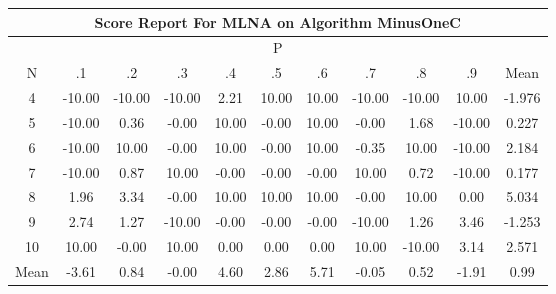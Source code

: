 \documentclass[11pt,a4paper]{report}
\begin{document}
\begin{longtable}{ | c || c | c | c | c | c | c | c | c | c || c |}
\hline
\multicolumn{11}{|c|}{ Score Report For MLNA on Algorithm MinusOneC} \\
\hline
\multicolumn{11}{|c|}{ P } \\
\hline
N & .1 & .2 & .3 & .4 & .5 & .6 & .7 & .8 & .9 & Mean\\
 \hline
 \hline
 \endhead
  4 &  \cellcolor[HTML]{FF0000} -10.00 &  \cellcolor[HTML]{FF0000} -10.00 &  \cellcolor[HTML]{FF0000} -10.00 &  \cellcolor[HTML]{C7C7FF} 2.21 &  \cellcolor[HTML]{0808FF} 10.00 &  \cellcolor[HTML]{0808FF} 10.00 &  \cellcolor[HTML]{FF0000} -10.00 &  \cellcolor[HTML]{FF0000} -10.00 &  \cellcolor[HTML]{0808FF} 10.00 & -1.976 \\
  5 &  \cellcolor[HTML]{FF0000} -10.00 &  \cellcolor[HTML]{F7F7FF} 0.36 &  \cellcolor[HTML]{FFFFFF} -0.00 &  \cellcolor[HTML]{0808FF} 10.00 &  \cellcolor[HTML]{FFFFFF} -0.00 &  \cellcolor[HTML]{0808FF} 10.00 &  \cellcolor[HTML]{FFFFFF} -0.00 &  \cellcolor[HTML]{D7D7FF} 1.68 &  \cellcolor[HTML]{FF0000} -10.00 & 0.227 \\
  6 &  \cellcolor[HTML]{FF0000} -10.00 &  \cellcolor[HTML]{0808FF} 10.00 &  \cellcolor[HTML]{FFFFFF} -0.00 &  \cellcolor[HTML]{0808FF} 10.00 &  \cellcolor[HTML]{FFFFFF} -0.00 &  \cellcolor[HTML]{0808FF} 10.00 &  \cellcolor[HTML]{FFF7F7} -0.35 &  \cellcolor[HTML]{0808FF} 10.00 &  \cellcolor[HTML]{FF0000} -10.00 & 2.184 \\
  7 &  \cellcolor[HTML]{FF0000} -10.00 &  \cellcolor[HTML]{E7E7FF} 0.87 &  \cellcolor[HTML]{0808FF} 10.00 &  \cellcolor[HTML]{FFFFFF} -0.00 &  \cellcolor[HTML]{FFFFFF} -0.00 &  \cellcolor[HTML]{FFFFFF} -0.00 &  \cellcolor[HTML]{0808FF} 10.00 &  \cellcolor[HTML]{EFEFFF} 0.72 &  \cellcolor[HTML]{FF0000} -10.00 & 0.177 \\
  8 &  \cellcolor[HTML]{CFCFFF} 1.96 &  \cellcolor[HTML]{A7A7FF} 3.34 &  \cellcolor[HTML]{FFFFFF} -0.00 &  \cellcolor[HTML]{0808FF} 10.00 &  \cellcolor[HTML]{0808FF} 10.00 &  \cellcolor[HTML]{0808FF} 10.00 &  \cellcolor[HTML]{FFFFFF} -0.00 &  \cellcolor[HTML]{0808FF} 10.00 &  \cellcolor[HTML]{FFFFFF} 0.00 & 5.034 \\
  9 &  \cellcolor[HTML]{B7B7FF} 2.74 &  \cellcolor[HTML]{DFDFFF} 1.27 &  \cellcolor[HTML]{FF0000} -10.00 &  \cellcolor[HTML]{FFFFFF} -0.00 &  \cellcolor[HTML]{FFFFFF} -0.00 &  \cellcolor[HTML]{FFFFFF} -0.00 &  \cellcolor[HTML]{FF0000} -10.00 &  \cellcolor[HTML]{DFDFFF} 1.26 &  \cellcolor[HTML]{A7A7FF} 3.46 & -1.253 \\
  10 &  \cellcolor[HTML]{0808FF} 10.00 &  \cellcolor[HTML]{FFFFFF} -0.00 &  \cellcolor[HTML]{0808FF} 10.00 &  \cellcolor[HTML]{FFFFFF} 0.00 &  \cellcolor[HTML]{FFFFFF} 0.00 &  \cellcolor[HTML]{FFFFFF} 0.00 &  \cellcolor[HTML]{0808FF} 10.00 &  \cellcolor[HTML]{FF0000} -10.00 &  \cellcolor[HTML]{AFAFFF} 3.14 & 2.571 \\
 \hline
 \hline
Mean &  \cellcolor[HTML]{FFA7A7} -3.61 &  \cellcolor[HTML]{E7E7FF} 0.84 &  \cellcolor[HTML]{FFFFFF} -0.00 &  \cellcolor[HTML]{8F8FFF} 4.60 &  \cellcolor[HTML]{B7B7FF} 2.86 &  \cellcolor[HTML]{7070FF} 5.71 &  \cellcolor[HTML]{FFFFFF} -0.05 &  \cellcolor[HTML]{EFEFFF} 0.52 &  \cellcolor[HTML]{FFCFCF} -1.91 &  \cellcolor[HTML]{E7E7FF} 0.99
\end{longtable}
\end{document}
